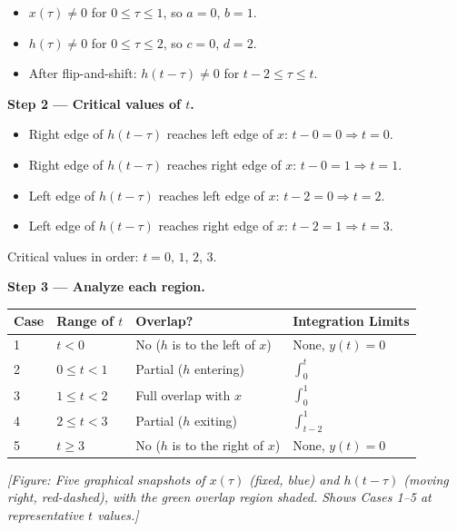 \documentclass[11pt]{article}
\begin{document}
\begin{itemize}
  \item $x(\tau) \neq 0$ for $0 \leq \tau \leq 1$, so $a=0$, $b=1$.
  \item $h(\tau) \neq 0$ for $0 \leq \tau \leq 2$, so $c=0$, $d=2$.
  \item After flip-and-shift: $h(t-\tau) \neq 0$ for $t-2 \leq \tau \leq t$.
\end{itemize}

\textbf{Step 2 — Critical values of $t$.}

\begin{itemize}
  \item Right edge of $h(t-\tau)$ reaches left edge of $x$: $t-0 = 0 \Rightarrow t=0$.
  \item Right edge of $h(t-\tau)$ reaches right edge of $x$: $t-0 = 1 \Rightarrow t=1$.
  \item Left edge of $h(t-\tau)$ reaches left edge of $x$: $t-2 = 0 \Rightarrow t=2$.
  \item Left edge of $h(t-\tau)$ reaches right edge of $x$: $t-2 = 1 \Rightarrow t=3$.
\end{itemize}

Critical values in order: $t = 0,\,1,\,2,\,3$.

\textbf{Step 3 — Analyze each region.}

\begin{center}
\begin{tabular}{|l|l|l|l|}
\hline
\textbf{Case} & \textbf{Range of $t$} & \textbf{Overlap?} & \textbf{Integration Limits} \\
\hline
1 & $t < 0$ & No ($h$ is to the left of $x$) & None, $y(t) = 0$ \\
\hline
2 & $0 \leq t < 1$ & Partial ($h$ entering) & $\int_0^t$ \\
\hline
3 & $1 \leq t < 2$ & Full overlap with $x$ & $\int_0^1$ \\
\hline
4 & $2 \leq t < 3$ & Partial ($h$ exiting) & $\int_{t-2}^1$ \\
\hline
5 & $t \geq 3$ & No ($h$ is to the right of $x$) & None, $y(t) = 0$ \\
\hline
\end{tabular}
\end{center}

\textit{[Figure: Five graphical snapshots of $x(\tau)$ (fixed, blue) and $h(t-\tau)$ (moving right, red-dashed), with the green overlap region shaded. Shows Cases 1–5 at representative $t$ values.]}
\end{document}
